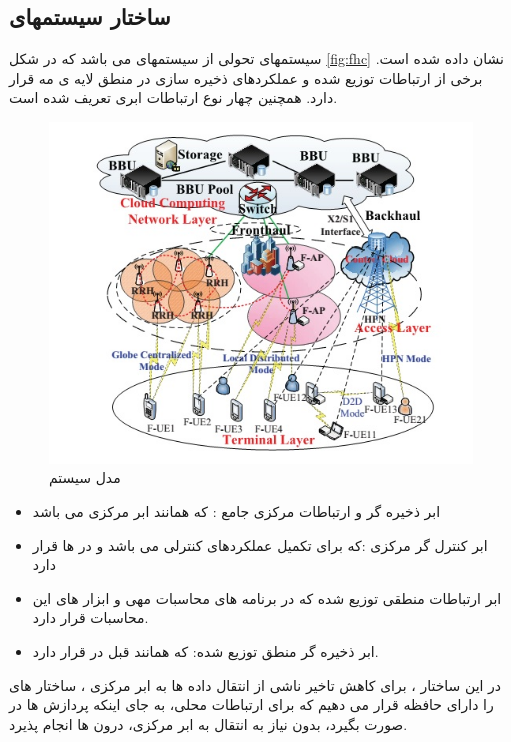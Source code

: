 \subsection{ساختار سیستمهای   }
 سیستمهای  تحولی از سیستمهای  می باشد که در شکل \eqref{fig:fhc} نشان داده شده است. برخی از ارتباطات توزیع شده و عملکردهای ذخیره سازی در منطق لایه ی مه قرار دارد. همچنین چهار نوع ارتباطات ابری تعریف شده است.
  \begin{figure}[H]
  \centering
    \includegraphics[scale =0.7]{fr}
  \caption{ مدل سیستم  \cite{fogComputing} }
  \label{fig:fr}
\end{figure}
 \begin{itemize}
 \item
 ابر ذخیره گر و ارتباطات مرکزی جامع :
 که همانند ابر مرکزی  می باشد
 \item
 ابر کنترل گر مرکزی :که برای تکمیل عملکردهای کنترلی  می باشد و در  ها قرار دارد
 \item
 ابر ارتباطات منطقی توزیع شده که در برنامه های محاسبات مهی و ابزار های این محاسبات قرار دارد.
 \item
  ابر ذخیره گر منطق توزیع شده:
  که همانند قبل در  قرار دارد.
 \end{itemize}
 در این ساختار ، برای کاهش تاخیر ناشی از انتقال داده ها به ابر مرکزی ، ساختار های  را دارای حافظه قرار می دهیم که برای ارتباطات محلی، به جای اینکه پردازش ها در  صورت بگیرد، بدون نیاز به انتقال به ابر مرکزی، درون  ها انجام پذیرد. 
